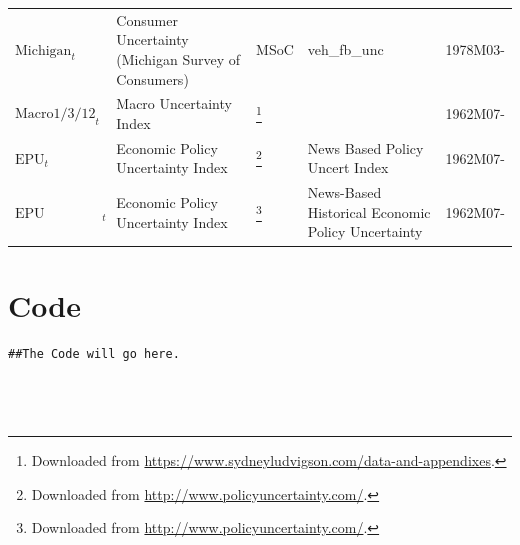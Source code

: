 \documentclass[a4paper,11pt,listof=nochaptergap,oneside,pointednumbers,bibtotoc,bigheadings,liststotoc]{scrbook}
\theoremstyle{mysatz}
\theoremstyle{mydefinition}
\theoremstyle{mybemerkung}
\begin{document}
\begin{table}[!h]
{\begin{tabular}{L{2.7cm}p{5.4cm}p{2.5cm}p{3.4cm}L{2.5cm}}
         $\text{Michigan}_t$ & Consumer Uncertainty (Michigan Survey of Consumers) & MSoC & veh_fb_unc & 1978M03- \\
 	$\text{Macro1/3/12}_t$ & Macro Uncertainty Index & \citet{juradoetal:15}\footnote{Downloaded from \url{https://www.sydneyludvigson.com/data-and-appendixes}.} &  & 1962M07- \\
	$\text{EPU}_t$ & Economic Policy Uncertainty Index & \citet{bakeretal:15}\footnote{Downloaded from \url{http://www.policyuncertainty.com/}.} & News Based Policy Uncert Index & 1962M07- \\
	$\text{EPU Historical}_t$ & Economic Policy Uncertainty Index & \citet{bakeretal:15}\footnote{Downloaded from \url{http://www.policyuncertainty.com/}.} & News-Based Historical Economic Policy Uncertainty & 1962M07- \\
        \bottomrule
\end{tabular}
}
\label{tab:data_sources} %
\end{table}




\fancyhfoffset[E,O]{0pt}
\section{Code}
\label{sec:rcode}


\begingroup
\fontsize{9pt}{12pt}\selectfont
\begin{verbatim}  
##The Code will go here.




\end{verbatim}  
\endgroup


\restoregeometry


\nocite{*}
\clearpage
\thispagestyle{empty}


\end{document}
